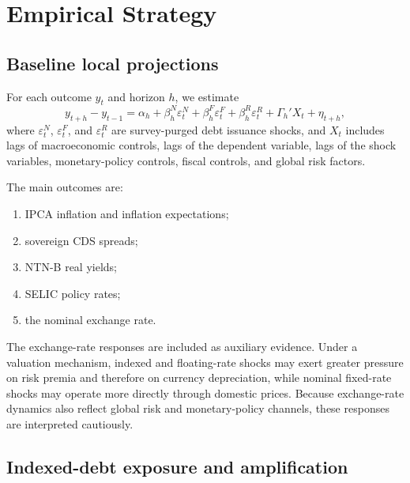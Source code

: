 \documentclass[12pt,a4paper]{article}
\begin{document}
\section{Empirical Strategy}
\label{sec:empirical}

\subsection{Baseline local projections}

For each outcome \(y_t\) and horizon \(h\), we estimate
\begin{equation}
y_{t+h}-y_{t-1}
=
\alpha_h
+
\beta_h^N\varepsilon_t^N
+
\beta_h^F\varepsilon_t^F
+
\beta_h^R\varepsilon_t^R
+
\Gamma_h'X_t
+\eta_{t+h},
\label{eq:lp_baseline}
\end{equation}
where \(\varepsilon_t^N\), \(\varepsilon_t^F\), and \(\varepsilon_t^R\) are survey-purged debt issuance shocks, and \(X_t\) includes lags of macroeconomic controls, lags of the dependent variable, lags of the shock variables, monetary-policy controls, fiscal controls, and global risk factors.

The main outcomes are:
\begin{enumerate}[leftmargin=1.2cm]
    \item IPCA inflation and inflation expectations;
    \item sovereign CDS spreads;
    \item NTN-B real yields;
    \item SELIC policy rates;
    \item the nominal exchange rate.
\end{enumerate}

The exchange-rate responses are included as auxiliary evidence. Under a valuation mechanism, indexed and floating-rate shocks may exert greater pressure on risk premia and therefore on currency depreciation, while nominal fixed-rate shocks may operate more directly through domestic prices. Because exchange-rate dynamics also reflect global risk and monetary-policy channels, these responses are interpreted cautiously.

\subsection{Indexed-debt exposure and amplification}
\end{document}
